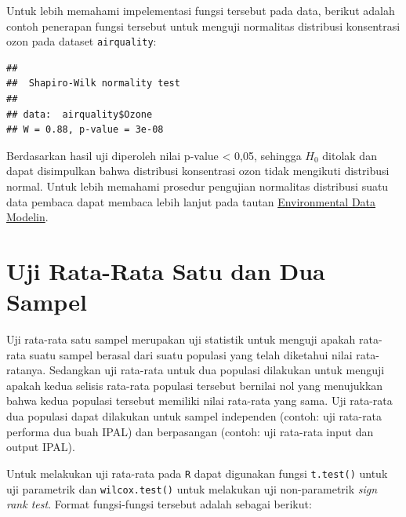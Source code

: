 \documentclass[
]{book}
\newenvironment{Shaded}{\begin{snugshade}}{\end{snugshade}}
\newcommand{\FunctionTok}[1]{\textcolor[rgb]{0.13,0.29,0.53}{\textbf{#1}}}
\newcommand{\NormalTok}[1]{#1}
\newcommand{\SpecialCharTok}[1]{\textcolor[rgb]{0.81,0.36,0.00}{\textbf{#1}}}
\theoremstyle{definition}
\theoremstyle{definition}
\theoremstyle{definition}
\theoremstyle{definition}
\theoremstyle{remark}
\begin{document}
Untuk lebih memahami impelementasi fungsi tersebut pada data, berikut adalah contoh penerapan fungsi tersebut untuk menguji normalitas distribusi konsentrasi ozon pada dataset \texttt{airquality}:

\begin{Shaded}
\end{Shaded}

\begin{verbatim}
## 
##  Shapiro-Wilk normality test
## 
## data:  airquality$Ozone
## W = 0.88, p-value = 3e-08
\end{verbatim}

Berdasarkan hasil uji diperoleh nilai p-value \textless{} 0,05, sehingga \(H_0\) ditolak dan dapat disimpulkan bahwa distribusi konsentrasi ozon tidak mengikuti distribusi normal. Untuk lebih memahami prosedur pengujian normalitas distribusi suatu data pembaca dapat membaca lebih lanjut pada tautan \href{https://environmental-data-modeling.netlify.com/tutorial/11_uji_hipotesis/\#11-4-uji-asumsi-normalitas-distribusi-data}{Environmental Data Modelin}.

\hypertarget{uji-rata-rata-satu-dan-dua-sampel}{%
\section{Uji Rata-Rata Satu dan Dua Sampel}\label{uji-rata-rata-satu-dan-dua-sampel}}

Uji rata-rata satu sampel merupakan uji statistik untuk menguji apakah rata-rata suatu sampel berasal dari suatu populasi yang telah diketahui nilai rata-ratanya. Sedangkan uji rata-rata untuk dua populasi dilakukan untuk menguji apakah kedua selisis rata-rata populasi tersebut bernilai nol yang menujukkan bahwa kedua populasi tersebut memiliki nilai rata-rata yang sama. Uji rata-rata dua populasi dapat dilakukan untuk sampel independen (contoh: uji rata-rata performa dua buah IPAL) dan berpasangan (contoh: uji rata-rata input dan output IPAL).

Untuk melakukan uji rata-rata pada \texttt{R} dapat digunakan fungsi \texttt{t.test()} untuk uji parametrik dan \texttt{wilcox.test()} untuk melakukan uji non-parametrik \emph{sign rank test}. Format fungsi-fungsi tersebut adalah sebagai berikut:
\end{document}
